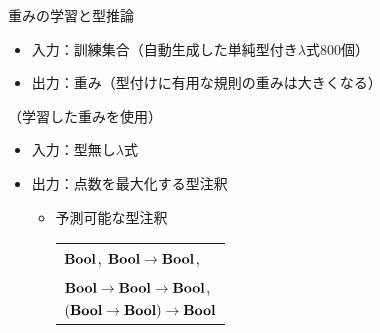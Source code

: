 \begin{block}{重みの学習と型推論}
  \begin{itemize}
  \item 入力：訓練集合（自動生成した単純型付き$\lambda$式800個）
  \item 出力：重み（型付けに有用な規則の重みは大きくなる）
  \end{itemize}
  （学習した重みを使用）
  \begin{itemize}
  \item 入力：型無し$\lambda$式
  \item 出力：点数を最大化する型注釈
    \begin{itemize}
    \item 予測可能な型注釈\\
      \begin{tabular}[t]{l}
        $\mathbf{Bool}$,\quad
        $\mathbf{Bool}\to\mathbf{Bool}$,\\
        $\mathbf{Bool}\to\mathbf{Bool}\to\mathbf{Bool}$, \\
        $(\mathbf{Bool}\to\mathbf{Bool})\to\mathbf{Bool}$
      \end{tabular}
    \end{itemize}
  \end{itemize}
\end{block}